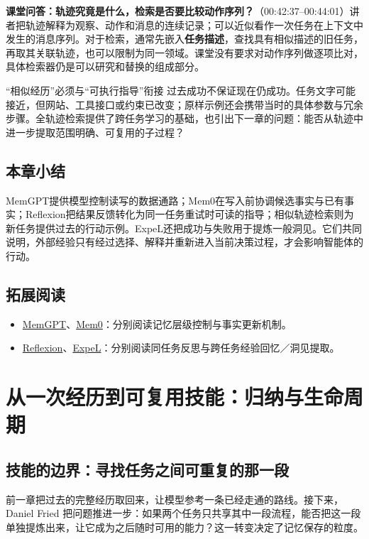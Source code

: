 \documentclass[11pt,a4paper]{article}
\begin{document}
\textbf{课堂问答：轨迹究竟是什么，检索是否要比较动作序列？}（00:42:37--00:44:01）讲者把轨迹解释为观察、动作和消息的连续记录；可以近似看作一次任务在上下文中发生的消息序列。对于检索，通常先嵌入\textbf{任务描述}，查找具有相似描述的旧任务，再取其关联轨迹，也可以限制为同一领域。课堂没有要求对动作序列做逐项比对，具体检索器仍是可以研究和替换的组成部分。

\begin{warningbox}{“相似经历”必须与“可执行指导”衔接}
过去成功不保证现在仍成功。任务文字可能接近，但网站、工具接口或约束已改变；原样示例还会携带当时的具体参数与冗余步骤。全轨迹检索提供了跨任务学习的基础，也引出下一章的问题：能否从轨迹中进一步提取范围明确、可复用的子过程？
\end{warningbox}

\subsection{本章小结}

MemGPT提供模型控制读写的数据通路；Mem0在写入前协调候选事实与已有事实；Reflexion把结果反馈转化为同一任务重试时可读的指导；相似轨迹检索则为新任务提供过去的行动示例。ExpeL还把成功与失败用于提炼一般洞见。它们共同说明，外部经验只有经过选择、解释并重新进入当前决策过程，才会影响智能体的行动。

\subsection{拓展阅读}

\begin{itemize}
\item \href{https://arxiv.org/abs/2310.08560}{MemGPT}、\href{https://arxiv.org/abs/2504.19413}{Mem0}：分别阅读记忆层级控制与事实更新机制。
\item \href{https://arxiv.org/abs/2303.11366}{Reflexion}、\href{https://arxiv.org/abs/2308.10144}{ExpeL}：分别阅读同任务反思与跨任务经验回忆／洞见提取。
\end{itemize}


\clearpage
\section{从一次经历到可复用技能：归纳与生命周期}

\subsection{技能的边界：寻找任务之间可重复的那一段}
前一章把过去的完整经历取回来，让模型参考一条已经走通的路线。接下来，Daniel Fried 把问题推进一步：如果两个任务只共享其中一段流程，能否把这一段单独提炼出来，让它成为之后随时可用的能力？这一转变决定了记忆保存的粒度。
\end{document}
